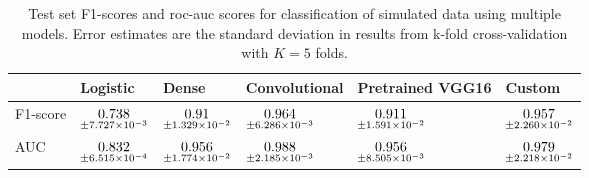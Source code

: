 \begin{table}
\centering
\caption{
Test set F1-scores and roc-auc scores for classification of simulated data using multiple models. 
Error estimates are the standard deviation in results from k-fold cross-validation 
with $K=5$ folds.
}
\label{tab:classification-simulated-f1-auc}
\begin{tabular}{llllll}
\toprule
{} &                                            Logistic &                                               Dense &                                       Convolutional &                                    Pretrained VGG16 &                                              Custom \\
\midrule
F1-score &  $\underset{\num{+- 7.727e-03 }  }{\num{ 0.738 } }$ &  $\underset{\num{+- 1.329e-02 }  }{\num{ 0.91 } }$ &  $\underset{\num{+- 6.286e-03 }  }{\num{ 0.964 } }$ &  $\underset{\num{+- 1.591e-02 }  }{\num{ 0.911 } }$ &  $\underset{\num{+- 2.260e-02 }  }{\num{ 0.957 } }$ \\
AUC      &  $\underset{\num{+- 6.515e-04 }  }{\num{ 0.832 } }$ &  $\underset{\num{+- 1.774e-02 }  }{\num{ 0.956 } }$ &  $\underset{\num{+- 2.185e-03 }  }{\num{ 0.988 } }$ &  $\underset{\num{+- 8.505e-03 }  }{\num{ 0.956 } }$ &  $\underset{\num{+- 2.218e-02 }  }{\num{ 0.979 } }$ \\
\bottomrule
\end{tabular}
\end{table}

